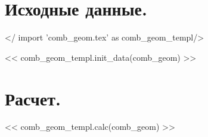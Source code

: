 \documentclass[a4paper,10pt]{article}
\begin{document}
    \section{Исходные данные.}

    </ import 'comb_geom.tex' as comb_geom_templ/>

    << comb_geom_templ.init_data(comb_geom) >>

    \section{Расчет.}

    << comb_geom_templ.calc(comb_geom) >>
\end{document}
